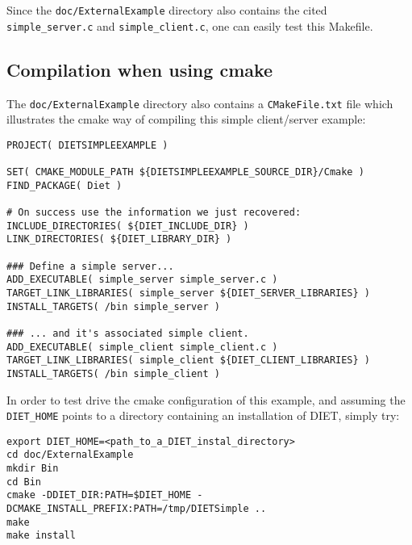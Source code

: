 Since the \texttt{doc/ExternalExample} directory also contains the
cited \texttt{simple\_server.c} and \texttt{simple\_client.c}, one
can easily test this Makefile.

\subsection{Compilation when using cmake}

The \texttt{doc/ExternalExample} directory also contains a
\texttt{CMakeFile.txt} file which illustrates the cmake way of compiling
this simple client/server example:
{\footnotesize
\begin{verbatim}
PROJECT( DIETSIMPLEEXAMPLE )

SET( CMAKE_MODULE_PATH ${DIETSIMPLEEXAMPLE_SOURCE_DIR}/Cmake )
FIND_PACKAGE( Diet )

# On success use the information we just recovered:
INCLUDE_DIRECTORIES( ${DIET_INCLUDE_DIR} )
LINK_DIRECTORIES( ${DIET_LIBRARY_DIR} )

### Define a simple server...
ADD_EXECUTABLE( simple_server simple_server.c )
TARGET_LINK_LIBRARIES( simple_server ${DIET_SERVER_LIBRARIES} )
INSTALL_TARGETS( /bin simple_server )

### ... and it's associated simple client.
ADD_EXECUTABLE( simple_client simple_client.c )
TARGET_LINK_LIBRARIES( simple_client ${DIET_CLIENT_LIBRARIES} )
INSTALL_TARGETS( /bin simple_client )
\end{verbatim}
}

In order to test drive the cmake configuration of this example, and
assuming the \texttt{DIET\_HOME} points to a directory containing
an installation of DIET, simply try:

{\footnotesize
\begin{verbatim}
export DIET_HOME=<path_to_a_DIET_instal_directory>
cd doc/ExternalExample
mkdir Bin
cd Bin
cmake -DDIET_DIR:PATH=$DIET_HOME -DCMAKE_INSTALL_PREFIX:PATH=/tmp/DIETSimple ..
make
make install
\end{verbatim}
}
